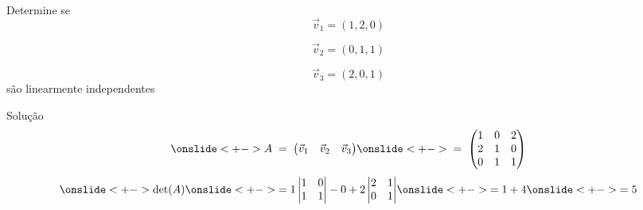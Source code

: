 \begin{question}
  Determine se
  \[
    \vec{v}_1 = (1, 2, 0)
  \]

  \[
    \vec{v}_2 = (0, 1, 1)
  \]

  \[
    \vec{v}_3 = (2, 0, 1)
  \]
  são linearmente independentes
\end{question}

\begin{resolution}{Solução}
  \[
    \onslide<+->{A
    \;=\; \begin{pmatrix}
          \vec{v}_1 & \vec{v}_2 & \vec{v}_3
        \end{pmatrix}}
    \onslide<+->{\;=\; \begin{pmatrix}
          1 & 0 & 2 \\
          2 & 1 & 0 \\
          0 & 1 & 1
        \end{pmatrix}}
  \]
  \bigskip
  \[
    \onslide<+->{\det(A)}
    \onslide<+->{= 1
      \begin{vmatrix}
        1 & 0 \\
        1 & 1
      \end{vmatrix}
      - 0
      + 2
      \begin{vmatrix}
        2 & 1 \\
        0 & 1
      \end{vmatrix}}
    \onslide<+->{= 1 + 4}
    \onslide<+->{= 5}
  \]

\end{resolution}

\endinput
